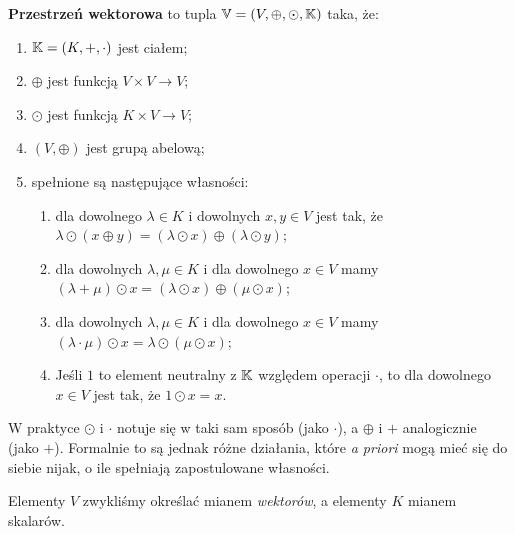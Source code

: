 \begin{definition}
	\textbf{Przestrzeń wektorowa} to tupla \( \mathbb{V} = (V, \oplus, \odot, \mathbb{K})\) taka, że:

	\begin{enumerate}
		\item \( \mathbb{K} = (K, +, \cdot) \) jest ciałem;
		\item \( \oplus \) jest funkcją \( V \times V \rightarrow V\);
		\item \( \odot \) jest funkcją \(K \times V \rightarrow V\);
		\item \( (V, \oplus)\) jest grupą abelową;
		\item spełnione są następujące własności:
		      \begin{enumerate}
			      \item dla dowolnego \( \lambda \in K \) i dowolnych \(x, y \in V\) jest tak, że \( \lambda \odot (x  \oplus y) = (\lambda \odot x) \oplus (\lambda \odot y) \);
			      \item dla dowolnych \( \lambda, \mu \in K\) i dla dowolnego \(x \in V\) mamy \( (\lambda + \mu) \odot x = (\lambda \odot x) \oplus (\mu \odot x)\);
			      \item dla dowolnych \( \lambda, \mu \in K\) i dla dowolnego \( x \in V\) mamy \((\lambda \cdot \mu) \odot x = \lambda \odot (\mu \odot x)\);
			      \item Jeśli \(1\) to element neutralny z \(\mathbb{K}\) względem operacji \(\cdot\), to dla dowolnego \(x \in V\) jest tak, że \(1 \odot x = x\).
		      \end{enumerate}
	\end{enumerate}

	W praktyce \(\odot\) i \(\cdot\) notuje się w taki sam sposób (jako \(\cdot\)), a \(\oplus\) i \(+\) analogicznie (jako \(+\)). Formalnie to są jednak różne działania, które \textit{a priori} mogą mieć się do siebie nijak, o ile spełniają zapostulowane własności.

	Elementy \(V\) zwykliśmy określać mianem \textit{wektorów}, a elementy \(K\) mianem skalarów.

\end{definition}


